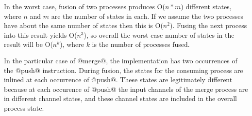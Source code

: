In the worst case, fusion of two processes produces O($n*m$) different states, where $n$ and $m$ are the number of states in each. If we assume the two processes have about the same number of states then this is O($n^2$). Fusing the next process into this result yields O($n^3$), so overall the worst case number of states in the result will be O($n^k$), where $k$ is the number of processes fused. 

In the particular case of @merge@, the implementation has two occurrences of the @push@ instruction. During fusion, the states for the consuming process are inlined at each occurrence of @push@. These states are legitimately different because at each occurence of @push@ the input channels of the merge process are in different channel states, and these channel states are included in the overall process state.




